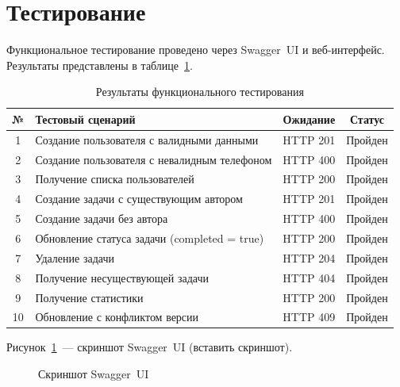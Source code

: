 \documentclass[a4paper,14pt]{extarticle}
\begin{document}
\clearpage
\section{Тестирование}

Функциональное тестирование проведено через Swagger~UI и веб-интерфейс. Результаты представлены в таблице~\ref{tab:tests}.

\begin{table}[H]
\caption{Результаты функционального тестирования}\label{tab:tests}
\centering
\small
\begin{tabularx}{\textwidth}{|c|X|c|c|}
\hline
\textbf{№} & \textbf{Тестовый сценарий} & \textbf{Ожидание} & \textbf{Статус} \\
\hline
1 & Создание пользователя с валидными данными & HTTP 201 & Пройден \\
\hline
2 & Создание пользователя с невалидным телефоном & HTTP 400 & Пройден \\
\hline
3 & Получение списка пользователей & HTTP 200 & Пройден \\
\hline
4 & Создание задачи с существующим автором & HTTP 201 & Пройден \\
\hline
5 & Создание задачи без автора & HTTP 400 & Пройден \\
\hline
6 & Обновление статуса задачи (completed = true) & HTTP 200 & Пройден \\
\hline
7 & Удаление задачи & HTTP 204 & Пройден \\
\hline
8 & Получение несуществующей задачи & HTTP 404 & Пройден \\
\hline
9 & Получение статистики & HTTP 200 & Пройден \\
\hline
10 & Обновление с конфликтом версии & HTTP 409 & Пройден \\
\hline
\end{tabularx}
\end{table}

Рисунок~\ref{fig:swagger}~--- скриншот Swagger~UI (вставить скриншот).

\begin{figure}[H]
\centering
{}
\caption{Скриншот Swagger~UI}\label{fig:swagger}
\end{figure}
\end{document}
